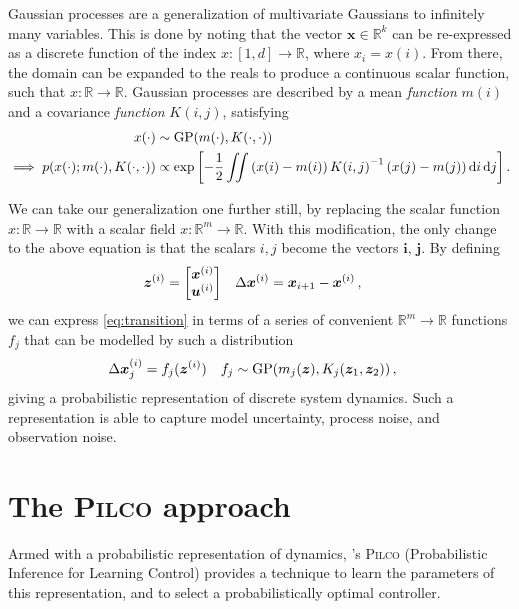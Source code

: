 \documentclass[main.tex]{subfiles}
\begin{document}
	Gaussian processes are a generalization of multivariate Gaussians to infinitely many variables.
	This is done by noting that the vector $\mathbf{x} \in \mathbb{R}^k$ can be re-expressed as a discrete function of the index $x\colon [1,d] \to \mathbb{R}$, where $x_i = x(i)$.
	From there, the domain can be expanded to the reals to produce a continuous scalar function, such that $x\colon \mathbb{R} \to \mathbb{R}$.
	Gaussian processes are described by a mean \emph{function} $m(i)$ and a covariance \emph{function} $K(i, j)$, satisfying
	\begin{align}
		x(\cdot) &\sim \mathrm{GP}(m(\cdot), K(\cdot,\cdot)) \\\implies
		p(x(\cdot); m(\cdot), K(\cdot,\cdot))
			&\propto \exp{\left[
				-\frac{1}{2}
				\iint
					\left(x(i) - m(i)\right)
					{K(i,j)}^{-1}
					\left(x(j) - m(j)\right)
				\mathop{}\!\mathrm{d}i \mathop{}\!\mathrm{d}j
			\right]}\,.
	\end{align}

	We can take our generalization one further still, by replacing the scalar function $x\colon \mathbb{R} \to \mathbb{R}$ with a scalar field $x\colon \mathbb{R}^m \to \mathbb{R}$.
	With this modification, the only change to the above equation is that the scalars $i,j$ become the vectors $\bm{i}$, $\bm{j}$.
	By defining
	\begin{align}
		\bm{z}^{(i)} &= \begin{bmatrix}\bm{x}^{(i)} \\ \bm{u}^{(i)}\end{bmatrix} &
		\Delta\bm{x}^{(i)} &= \bm{x}_{i + 1} - \bm{x}^{(i)}\,,
	\end{align}
	we can express \cref{eq:transition} in terms of a series of convenient $\mathbb{R}^m \to \mathbb{R}$ functions $f_j$ that can be modelled by such a distribution
	\begin{align}
		\Delta\bm{x}^{(i)}_j &= f_j(\bm{z}^{(i)}) & f_j &\sim \mathrm{GP}(m_j(\bm{z}), K_j(\bm{z}_1, \bm{z}_2))\,, \label{eq:transition-gp}
	\end{align}
	giving a probabilistic representation of discrete system dynamics.
	Such a representation is able to capture model uncertainty, process noise, and observation noise.

\section{The \textsc{Pilco} approach}

	Armed with a probabilistic representation of dynamics, \citeauthor{pilco}'s \textsc{Pilco} \cite{pilco} (Probabilistic Inference for Learning Control) provides a technique to learn the parameters of this representation, and to select a probabilistically optimal controller.
\end{document}
